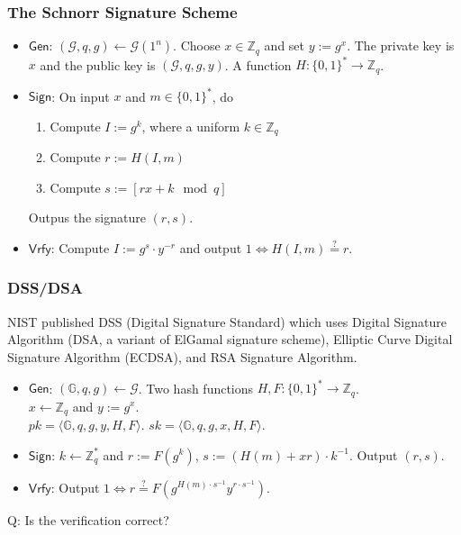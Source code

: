 \begin{frame}\frametitle{The Schnorr Signature Scheme}
\begin{construction}
\begin{itemize}
\item $\mathsf{Gen}$: $(\mathcal{G}, q, g) \gets \mathcal{G}(1^n)$. Choose $x \in \mathbb{Z}_q$ and set $y := g^x$. The private key is $x$ and the public key is $(\mathcal{G}, q, g, y)$. A function $H : \{0,1\}^* \to \mathbb{Z}_q$.
\item $\mathsf{Sign}$: On input $x$ and $m \in \{0,1\}^*$, do
\begin{enumerate}
\item Compute $I := g^k$, where a uniform $k \in \mathbb{Z}_q$
\item Compute $r := H(I, m)$
\item Compute $s := [ rx + k \mod q]$
\end{enumerate}
Outpus the signature $(r, s)$.
\item $\mathsf{Vrfy}$: Compute $I := g^s \cdot y^{-r}$ and output $1 \iff H(I, m) \overset{?}{=} r.$
\end{itemize}
\end{construction}
\end{frame}

\begin{frame}\frametitle{DSS/DSA}
NIST published DSS (Digital Signature Standard) which uses Digital Signature Algorithm (DSA, a variant of ElGamal signature scheme), Elliptic Curve Digital Signature Algorithm (ECDSA), and RSA Signature Algorithm.
\begin{construction}
\begin{itemize}
\item $\mathsf{Gen}$: $(\mathbb{G},q,g) \gets \mathcal{G}$. Two hash functions $H, F : \{0,1\}^* \to \mathbb{Z}_q$. \\
$x \gets \mathbb{Z}_q$ and $y:= g^x $.\\
$pk = \langle \mathbb{G},q,g,y,H,F\rangle$. $sk=\langle \mathbb{G},q,g,x,H,F\rangle$.
\item $\mathsf{Sign}$: $k\gets \mathbb{Z}^*_q$ and $r:= F(g^k) $, $s:= (H(m)+xr)\cdot k^{-1}$. Output $(r,s)$.
\item $\mathsf{Vrfy}$: Output $1 \iff r \overset{?}{=} F(g^{H(m)\cdot s^{-1}}y^{r\cdot s^{-1}}).$
\end{itemize}
\end{construction}
\alert{Q: Is the verification correct?}
\end{frame}
\begin{comment}
\[r = [[g^k \bmod p] \bmod q]\; \text{and}\; s= [(\hat{m}+xr)\cdot k^{-1} \bmod q],\; \hat{m}=H(m). \]
\begin{align*}g^{\hat{m}s^{-1}}y^{rs^{-1}} &= g^{\hat{m}\cdot (\hat{m}+xr)^{-1}k}g^{xr\cdot (\hat{m}+xr)^{-1}k} \pmod p \\
	&= g^{(\hat{m}+xr)\cdot (\hat{m}+xr)^{-1}k} \pmod p \\  
	&= g^k \pmod p.
	\end{align*}
\[ [[g^k \bmod p] \bmod q] = r.\]
\end{comment}


